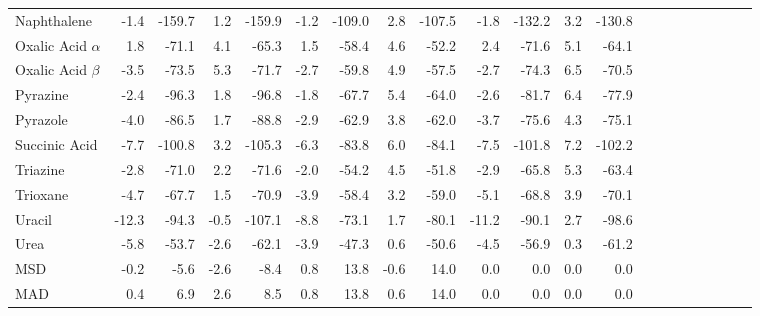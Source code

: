 \begin{table}[h]
\begin{tabular}{lrrrrrrrrrrrrrrrrrrrr}
Naphthalene & -1.4 & -159.7 & 1.2 & -159.9 & -1.2 & -109.0 & 2.8 & -107.5 & -1.8 & -132.2 & 3.2 & -130.8 \\
Oxalic Acid $\alpha$ & 1.8 & -71.1 & 4.1 & -65.3 & 1.5 & -58.4 & 4.6 & -52.2 & 2.4 & -71.6 & 5.1 & -64.1 \\
Oxalic Acid $\beta$ & -3.5 & -73.5 & 5.3 & -71.7 & -2.7 & -59.8 & 4.9 & -57.5 & -2.7 & -74.3 & 6.5 & -70.5 \\
Pyrazine & -2.4 & -96.3 & 1.8 & -96.8 & -1.8 & -67.7 & 5.4 & -64.0 & -2.6 & -81.7 & 6.4 & -77.9 \\
Pyrazole & -4.0 & -86.5 & 1.7 & -88.8 & -2.9 & -62.9 & 3.8 & -62.0 & -3.7 & -75.6 & 4.3 & -75.1 \\
Succinic Acid & -7.7 & -100.8 & 3.2 & -105.3 & -6.3 & -83.8 & 6.0 & -84.1 & -7.5 & -101.8 & 7.2 & -102.2 \\
Triazine & -2.8 & -71.0 & 2.2 & -71.6 & -2.0 & -54.2 & 4.5 & -51.8 & -2.9 & -65.8 & 5.3 & -63.4 \\
Trioxane & -4.7 & -67.7 & 1.5 & -70.9 & -3.9 & -58.4 & 3.2 & -59.0 & -5.1 & -68.8 & 3.9 & -70.1 \\
Uracil & -12.3 & -94.3 & -0.5 & -107.1 & -8.8 & -73.1 & 1.7 & -80.1 & -11.2 & -90.1 & 2.7 & -98.6 \\
Urea & -5.8 & -53.7 & -2.6 & -62.1 & -3.9 & -47.3 & 0.6 & -50.6 & -4.5 & -56.9 & 0.3 & -61.2 \\
MSD & -0.2 & -5.6 & -2.6 & -8.4 & 0.8 & 13.8 & -0.6 & 14.0 & 0.0 & 0.0 & 0.0 & 0.0 \\
MAD & 0.4 & 6.9 & 2.6 & 8.5 & 0.8 & 13.8 & 0.6 & 14.0 & 0.0 & 0.0 & 0.0 & 0.0 \\
\bottomrule
\end{tabular}

\end{table}